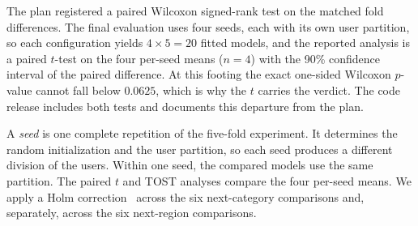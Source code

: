 The plan registered a paired Wilcoxon signed-rank test on the matched fold differences. The final
evaluation uses four seeds, each with its own user partition, so each configuration yields
$4\times5=20$ fitted models, and the reported analysis is a paired $t$-test on the four per-seed
means ($n{=}4$) with the 90\% confidence interval of the paired difference. At this footing the
exact one-sided Wilcoxon $p$-value cannot fall below $0.0625$, which is why the $t$ carries the
verdict. The code release includes both tests and documents this departure from the plan.


A \emph{seed} is one complete repetition of the five-fold experiment. It determines the random initialization and the user partition, so each seed produces a different division of the users. Within one seed, the compared models use the same partition. The paired $t$ and TOST analyses compare the four per-seed means. We apply a Holm correction~\cite{holm1979} across the six next-category comparisons and, separately, across the six next-region comparisons.

